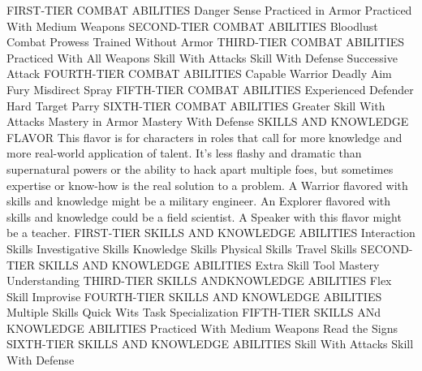 FIRST-TIER COMBAT ABILITIES
Danger Sense
Practiced in Armor
Practiced With Medium Weapons
SECOND-TIER COMBAT ABILITIES
Bloodlust
Combat Prowess
Trained Without Armor
THIRD-TIER COMBAT ABILITIES
Practiced With All Weapons
Skill With Attacks
Skill With Defense
Successive Attack
FOURTH-TIER COMBAT ABILITIES
Capable Warrior
Deadly Aim
Fury
Misdirect
Spray
FIFTH-TIER COMBAT ABILITIES
Experienced Defender
Hard Target
Parry
SIXTH-TIER COMBAT ABILITIES
Greater Skill With Attacks
Mastery in Armor
Mastery With Defense
SKILLS AND KNOWLEDGE FLAVOR
This flavor is for characters in roles that call for more knowledge and more real-world application of talent. It’s less flashy and dramatic than supernatural powers or the ability to hack apart multiple foes, but sometimes expertise or
know-how is the real solution to a problem.
A Warrior flavored with skills and knowledge might be a military engineer. An Explorer flavored with skills and knowledge could be a field scientist. A Speaker with this flavor might be a teacher.
FIRST-TIER SKILLS AND KNOWLEDGE ABILITIES 
Interaction Skills
Investigative Skills 
Knowledge Skills
Physical Skills
Travel Skills
SECOND-TIER SKILLS AND KNOWLEDGE ABILITIES 
Extra Skill
Tool Mastery
Understanding
THIRD-TIER SKILLS ANDKNOWLEDGE ABILITIES 
Flex Skill
Improvise
FOURTH-TIER SKILLS AND KNOWLEDGE ABILITIES 
Multiple Skills
Quick Wits
Task Specialization
FIFTH-TIER SKILLS ANd KNOWLEDGE ABILITIES
Practiced With Medium Weapons
Read the Signs
SIXTH-TIER SKILLS AND KNOWLEDGE ABILITIES
Skill With Attacks
Skill With Defense
